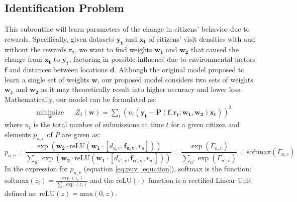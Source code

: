 \documentclass[12pt]{article}
\newcommand{\vect}[1]{\mathbf{#1}}  %
\newcommand{\matr}[1]{\mathbf{#1}}  %
\begin{document}
    \subsection{Identification Problem} \label{sec:iden_problem}
    This subroutine will learn parameters of the change in citizens' behavior due to rewards. Specifically, given datasets $\vect{y_t}$ and $\vect{x_t}$ of citizens' visit densities with and without the rewards $\vect{r_t}$, we want to find weights $\matr{w_1}$ and $\matr{w_2}$ that caused the change from $\vect{x_t}$ to $\vect{y_t}$, factoring in possible influence due to environmental factors $\matr{f}$ and distances between locations $\matr{d}$. Although the original model proposed to learn a single set of weights $\matr{w}$, our proposed model considers two sets of weights $\matr{w_1}$ and $\matr{w_2}$ as it may theoretically result into higher accuracy and lower loss. Mathematically, our model can be formulated as:
    \begin{equation} \label{eq:iden_problem}
    \begin{aligned}
    & \underset{\matr{w}}{\text{minimize}}
    & & Z_I(\matr{w}) = \sum_{t} (u_t(\vect{y_t} - \matr{P}(\matr{f}, \vect{r_t}; \matr{w_1}, \matr{w_2})\vect{x_t}))^{2}
    \end{aligned}
    \end{equation}
    where $u_t$ is the total number of submissions at time $t$ for a given citizen and elements $p_{u, v}$ of $P$ are given as:
    \begin{equation} \label{eq:puv_equation}
    p_{u, v} = \frac{\exp(\matr{w_2} \cdot \text{reLU} (\matr{w_1} \cdot [d_{u, v}, \vect{f_{u, v}}, r_{u}]))}{\sum_{u'} \exp(\matr{w_2} \cdot \text{reLU} (\matr{w_1} \cdot [d_{u', v}, \vect{f_{u', v}}, r_{u'}]))} = \frac{\exp(\Gamma_{u, v})}{\sum_{u'}\exp(\Gamma_{u', v})} = \text{softmax}(\Gamma_{u, v})
    \end{equation}
    In the expression for $p_{u,v}$ (equation \ref{eq:puv_equation}), softmax is the function: softmax$(z_i) = \frac{\exp(z_i)}{\sum_{i}\exp(z_i)}$ and the reLU$(\cdot)$ function is a rectified Linear Unit defined as: reLU$(z) = \text{max}(0, z)$.
    
\end{document}
